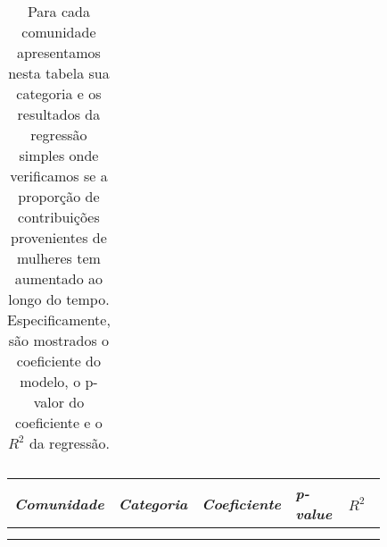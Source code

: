 \begin{longtabu}{@{}
	p{0.2\linewidth}
	p{0.2\linewidth}
	P{0.15\linewidth}
	P{0.15\linewidth}
	P{0.13\linewidth}@{}}
\caption[Resultados estatísticos para as contribuições ao longo do tempo]{Para cada comunidade apresentamos nesta tabela sua categoria e os resultados da regressão simples onde verificamos se a proporção de contribuições provenientes de mulheres tem aumentado ao longo do tempo. Especificamente, são mostrados o coeficiente do modelo, o p-valor do coeficiente e o $R^2$ da regressão.}
\end{longtabu}

\small
\begin{longtabu}{@{}
	p{0.2\linewidth}
	p{0.2\linewidth}
	P{0.15\linewidth}
	P{0.15\linewidth}
	P{0.13\linewidth}@{}}
\toprule
\textit{Comunidade}        & \textit{Categoria}           & \textit{Coeficiente} & \textit{p-value} & $R^2$ \\ \midrule
\endhead

\\ \hline
\endfoot


\end{longtabu}
